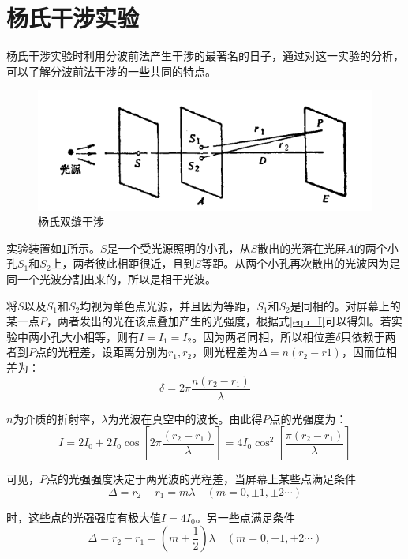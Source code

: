 \documentclass[UTF8]{ctexart}
\begin{document}
	\section{杨氏干涉实验}
	杨氏干涉实验时利用分波前法产生干涉的最著名的日子，通过对这一实验的分析，可以了解分波前法干涉的一些共同的特点。
	\begin{figure}[h]
		\centering
		\includegraphics[width=12cm]{Yang.png}
		\caption{杨氏双缝干涉}
		\label{figure_Yang}
	\end{figure}

	实验装置如\ref{figure_Yang}所示。$ S $是一个受光源照明的小孔，从$ S $散出的光落在光屏$ A $的两个小孔$ S_{1} $和$ S_{2} $上，两者彼此相距很近，且到$ S $等距。从两个小孔再次散出的光波因为是同一个光波分割出来的，所以是相干光波。
	
	将$ S $以及$ S_{1} $和$ S_{2} $均视为单色点光源，并且因为等距，$ S_{1} $和$ S_{2} $是同相的。对屏幕上的某一点$ P $，两者发出的光在该点叠加产生的光强度，根据式\ref{equ_I}可以得知。若实验中两小孔大小相等，则有$ I=I_{1}=I_{2} $。因为两者同相，所以相位差$ \delta $只依赖于两者到$ P $点的光程差，设距离分别为$ r_{1},r_{2} $，则光程差为$ \Delta=n(r_{2}-r{1}) $，因而位相差为：
	\begin{equation}
		\delta = 2 \pi \frac{n(r_{2}-r_{1})}{\lambda}
	\end{equation}
	
\noindent  $ n $为介质的折射率，$ \lambda $为光波在真空中的波长。由此得$ P $点的光强度为：
\begin{equation}
I=2 I_{0}+2 I_{0} \cos \left[2 \pi \frac{\left(r_{2}-r_{1}\right)}{\lambda}\right]=4 I_{0} \cos ^{2}\left[\frac{\pi\left(r_{2}-r_{1}\right)}{\lambda}\right]
\end{equation}

\noindent 可见，$ P $点的光强强度决定于两光波的光程差，当屏幕上某些点满足条件
\begin{equation}
\Delta=r_{2}-r_{1}=m \lambda \quad(m=0, \pm 1, \pm 2 \cdots)
\end{equation}

\noindent 时，这些点的光强强度有极大值$ I=4I_{0} $。另一些点满足条件
\begin{equation}
\Delta=r_{2}-r_{1}=\left(m+\frac{1}{2}\right) \lambda \quad(m=0, \pm 1, \pm 2 \cdots)
\end{equation}
\end{document}
